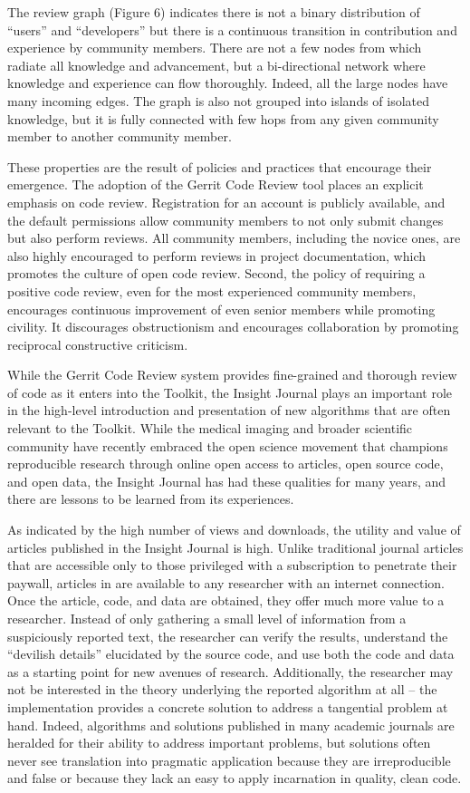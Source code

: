 \documentclass{frontiersENG} %
\begin{document}
The review graph (Figure 6) indicates there is not a binary distribution of
``users'' and ``developers'' but there is a continuous transition in
contribution and experience by community members. There are not a few nodes
from which radiate all knowledge and advancement, but a bi-directional network
where knowledge and experience can flow thoroughly.  Indeed, all the large
nodes have many incoming edges. The graph is also not grouped into islands of
isolated knowledge, but it is fully connected with few hops from any given
community member to another community member.

These properties are the result of policies and practices that encourage their
emergence. The adoption of the Gerrit Code Review tool places an
explicit emphasis on code review.  Registration for an account is publicly
available, and the default permissions allow community members to not only
submit changes but also perform reviews. All community members, including the
novice ones, are also highly encouraged to perform reviews in project
documentation, which promotes the culture of open code review. Second, the
policy of requiring a positive code review, even for the most experienced
community members, encourages continuous improvement of even senior members
while promoting civility. It discourages obstructionism and encourages
collaboration by promoting reciprocal constructive criticism.

While the Gerrit Code Review system provides fine-grained and thorough review
of code as it enters into the Toolkit, the Insight Journal plays an important
role in the high-level introduction and presentation of new algorithms that
are often relevant to the Toolkit. While the medical imaging and broader
scientific community have recently embraced the open science movement that
champions reproducible research through online open access to articles, open
source code, and open data, the Insight Journal has had these qualities for
many years, and there are lessons to be learned from its experiences.

As indicated by the high number of views and downloads, the utility and value of
articles published in the Insight Journal is high.  Unlike traditional
journal articles that are accessible only to those privileged with a
subscription to penetrate their paywall, articles in are available to any
researcher with an internet connection. Once the article, code, and data are
obtained, they offer much more value to a researcher. Instead of only gathering
a small level of information from a suspiciously reported text, the researcher
can verify the results, understand the ``devilish details'' elucidated by the
source code, and use both the code and data as a starting point for new avenues
of research. Additionally, the researcher may not be interested in the theory
underlying the reported algorithm at all -- the implementation provides a
concrete solution to address a tangential problem at hand. Indeed, algorithms
and solutions published in many academic journals are heralded for their
ability to address important problems, but solutions often never see
translation into pragmatic application because they are irreproducible and
false or because they lack an easy to apply incarnation in quality, clean code.
\end{document}
